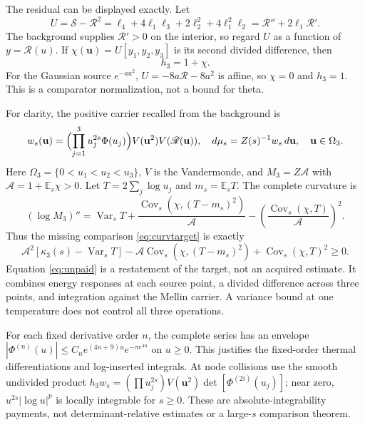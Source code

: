 \documentclass[11pt,letterpaper]{article}
\numberwithin{equation}{section}
\theoremstyle{remark}
\DeclareMathOperator{\Var}{Var}
\DeclareMathOperator{\Cov}{Cov}
\newcommand{\E}{\mathbb E}
\newcommand{\dd}{\,d}
\newcommand{\srcR}{\mathscr R}
\newcommand{\srcS}{\mathscr S}
\begin{document}
The residual can be displayed exactly. Let
\begin{equation}
 U=\srcS-\srcR^2
 =\ell_4+4\ell_1\ell_3+2\ell_2^2+4\ell_1^2\ell_2
 =\srcR''+2\ell_1\srcR'. \label{eq:U}
\end{equation}
The background supplies $\srcR'>0$ on the interior, so regard $U$ as a
function of $y=\srcR(u)$. If $\chi(\mathbf u)=U[y_1,y_2,y_3]$ is its
second divided difference, then
\begin{equation}
 h_3=1+\chi. \label{eq:chi}
\end{equation}
For the Gaussian source $e^{-au^2}$, $U=-8a\srcR-8a^2$ is affine,
so $\chi=0$ and $h_3=1$. This is a comparator normalization, not a
bound for theta.

For clarity, the positive carrier recalled from the background is
\begin{equation}
 w_s(\mathbf u)=\Bigl(\prod_{j=1}^3u_j^{2s}\Phi(u_j)\Bigr)
               V(\mathbf u^2)V(\srcR(\mathbf u)),\quad
 d\mu_s=Z(s)^{-1}w_s\dd\mathbf u,\quad \mathbf u\in\Omega_3.
 \label{eq:carrier}
\end{equation}
Here $\Omega_3=\{0<u_1<u_2<u_3\}$, $V$ is the Vandermonde, and
$M_3=Z\mathcal A$ with $\mathcal A=1+\E_s\chi>0$.
Let $T=2\sum_j\log u_j$ and $m_s=\E_sT$. The complete curvature is
\begin{equation}
 (\log M_3)''=
 \Var_sT+\frac{\Cov_s(\chi,(T-m_s)^2)}{\mathcal A}
 -\left(\frac{\Cov_s(\chi,T)}{\mathcal A}\right)^2. \label{eq:completecurv}
\end{equation}
Thus the missing comparison \eqref{eq:curvtarget} is exactly
\begin{equation}
 \mathcal A^2[\kappa_3(s)-\Var_sT]
 -\mathcal A\Cov_s(\chi,(T-m_s)^2)
 +\Cov_s(\chi,T)^2\ge0. \label{eq:unpaid}
\end{equation}
Equation \eqref{eq:unpaid} is a restatement of the target, not an acquired
estimate. It combines energy responses at each source point, a divided
difference across three points, and integration against the Mellin
carrier. A variance bound at one temperature does not control all three
operations.

For each fixed derivative order $n$, the complete series has an envelope
$|\Phi^{(n)}(u)|\le C_ne^{(4n+9)u}e^{-\pi e^{4u}}$ on $u\ge0$.
This justifies the fixed-order thermal differentiations and log-inserted
integrals. At node collisions use the smooth undivided product
$h_3w_s=(\prod u_j^{2s})V(\mathbf u^2)\det[\Phi^{(2i)}(u_j)]$;
near zero, $u^{2s}|\log u|^p$ is locally integrable for $s\ge0$.
These are absolute-integrability payments, not determinant-relative
estimates or a large-$s$ comparison theorem.
\end{document}
